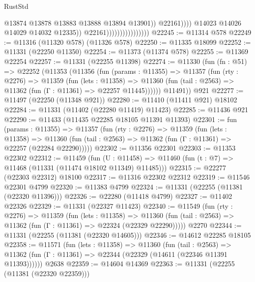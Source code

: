 \begin{lexlean}{RustStd}
\begin{coremodule}
                                                    @13874
                                                    @13878
                                                    @13883
                                                    @13888
                                                    @13894
                                                    @13901))
                                                @22161))))
                                        @14023
                                        @14026
                                        @14029
                                        @14032
                                        @12335))
                                    @22161))))))))))))))))
@22245 := @11314 @578
@22249 := @11316 (@11320 @578) (@11326 @578)
@22250 := @11335 @18099
@22252 := @11331 (@22250 @11350)
@22254 := @11373 (@11374 @578)
@22255 := @11369 @22254
@22257 := @11331 (@22255 @11398)
@22274 := @11330
    (fun (fn : @51) =>
    @22252
      (@11353
        (@11356
          (fun (params : @11355) =>
          @11357
            (fun (rty : @2276) =>
            @11359
              (fun (lets : @11358) =>
              @11360 (fun (tail : @2563) => @11362 (fun (Γ : @11361) => @22257 @11445))))))
        @11491))
    @921
@22277 := @11497 (@22250 (@11348 @921))
@22280 := @11410 (@11411 @921) @18102
@22284 := @11331 (@11402 (@22280 @11419) @11423)
@22285 := @11436 @921
@22290 := @11433 (@11435 @22285 @18105 @11391 @11393)
@22301 := fun (params : @11355) =>
  @11357
    (fun (rty : @2276) =>
    @11359
      (fun (lets : @11358) =>
      @11360 (fun (tail : @2563) => @11362 (fun (Γ : @11361) => @22257 (@22284 @22290)))))
@22302 := @11356 @22301
@22303 := @11353 @22302
@22312 := @11459
    (fun (U : @11458) => @11460 (fun (t : @7) => @11468 (@11331 (@11474 @18102 @11349) @11485)))
@22315 := @22277 (@22303 @22312) @18100
@22317 := @11316 @22302 @22312
@22319 := @11546 @22301 @4799
@22320 := @11383 @4799
@22324 := @11331 (@22255 (@11381 (@22320 @11396)))
@22326 := @22280 (@11418 @4799)
@22327 := @11402 @22326
@22329 := @11331 (@22327 @11423)
@22340 := @11549
    (fun (rty : @2276) =>
    @11359
      (fun (lets : @11358) =>
      @11360 (fun (tail : @2563) => @11362 (fun (Γ : @11361) => @22324 (@22329 @22290)))))
    @2270
@22344 := @11331 (@22255 (@11381 (@22320 @14605)))
@22346 := @14612 @22285 @18105
@22358 := @11571
    (fun (lets : @11358) =>
    @11360
      (fun (tail : @2563) =>
      @11362 (fun (Γ : @11361) => @22344 (@22329 (@14611 (@22346 @11391 @11393))))))
    @2638
@22359 := @14604 @14369
@22363 := @11331 (@22255 (@11381 (@22320 @22359)))

\end{coremodule}
\end{lexlean}

